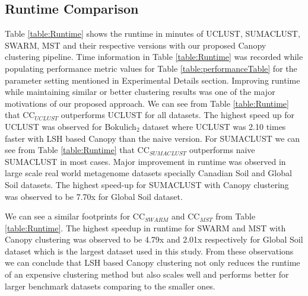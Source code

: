 \documentclass[10pt, conference, compsocconf]{IEEEtran}
\begin{document}
\subsection{\textbf{Runtime Comparison}} Table \ref{table:Runtime} shows the runtime in minutes of UCLUST, SUMACLUST, SWARM, MST and their respective versions with our proposed Canopy clustering pipeline. Time information in Table \ref{table:Runtime} was recorded while populating performance metric values for Table \ref{table:performanceTable} for the parameter setting mentioned in Experimental Details section. Improving runtime while maintaining similar or better clustering results was one of the major motivations of our proposed approach. We can see from Table \ref{table:Runtime} that CC$_{UCLUST}$ outperforms UCLUST for all datasets. The highest speed up for UCLUST was observed for Bokulich$_2$ dataset where UCLUST was 2.10 times faster with LSH based Canopy than the naive version. For SUMACLUST we can see from Table \ref{table:Runtime} that CC$_{SUMACLUST}$ outperforms naive SUMACLUST in most cases. Major improvement in runtime was observed in large scale real world metagenome datasets specially Canadian Soil and Global Soil datasets. The highest speed-up for SUMACLUST with Canopy clustering was observed to be 7.70x for Global Soil dataset.

We can see a similar footprints for CC$_{SWARM}$ and CC$_{MST}$ from Table \ref{table:Runtime}. The highest speedup in runtime for SWARM and MST with Canopy clustering was observed to be 4.79x and 2.01x respectively for Global Soil dataset which is the largest dataset used in this study. From these observations we can conclude that LSH based Canopy clustering not only reduces the runtime of an expensive clustering method but also scales well and performs better for larger benchmark datasets comparing to the smaller ones.   
\end{document}
